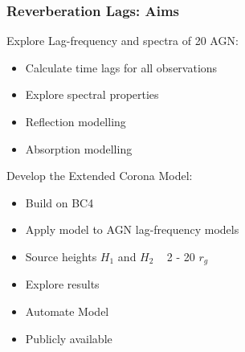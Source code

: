 \documentclass[]{beamer}
\begin{document}
\begin{frame}
\frametitle{Reverberation Lags: Aims}
 \noindent\begin{minipage}[t]{.45\textwidth}
  Explore Lag-frequency and spectra of 20 AGN:
  \begin{itemize}
  \item Calculate time lags for all observations
  \item Explore spectral properties
  \item Reflection modelling 
  \item Absorption modelling
  \end{itemize}
 \end{minipage}\hspace{.5cm}  %
\pause
 \begin{minipage}[t]{.45\textwidth}
   Develop the Extended Corona Model:
   \begin{itemize}
   \item Build on BC4
   \item Apply model to AGN lag-frequency models
   \item Source heights $H_1$ and $H_2$ ~ 2 - 20 $r_g$
   \item Explore results
   \item Automate Model
   \item Publicly available
 \end{itemize}
 \end{minipage}
\end{frame}
\end{document}
